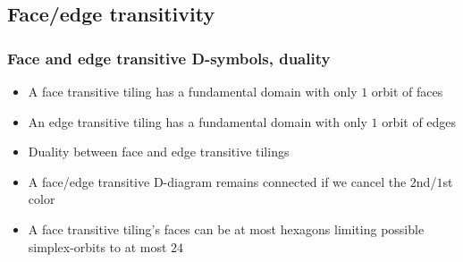 \subsection{Face/edge transitivity}
\begin{frame}
  \frametitle{Face and edge transitive D-symbols, duality}
  \begin{itemize}
    \item A face transitive tiling has a fundamental domain with only $1$ orbit
      of faces
    \item An edge transitive tiling has a fundamental domain with only $1$ orbit
      of edges
    \item Duality between face and edge transitive tilings
    \item A face/edge transitive D-diagram remains connected if we cancel the
      $2$nd/$1$st color 
    \item A face transitive tiling's faces can be at most hexagons limiting
      possible simplex-orbits to at most $24$  
  \end{itemize}
\end{frame}

